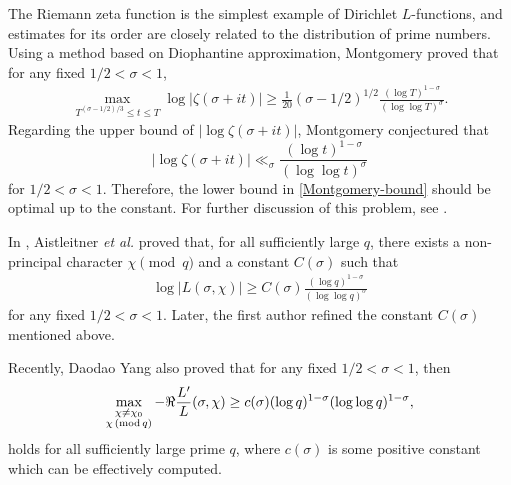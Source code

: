 \documentclass[12pt]{amsart}
\numberwithin{equation}{section}
\theoremstyle{plain}
\theoremstyle{remark}
\theoremstyle{definition}
\theoremstyle{remark}
\renewcommand{\mod}[1]{\,({\rm mod}\,#1)}
\begin{document}
The Riemann zeta function is the simplest example of Dirichlet $L$-functions, and estimates for its order are closely related to the distribution of prime numbers. Using a method based on Diophantine approximation, Montgomery \cite{Montgomery1977} proved that
for any fixed $1/2<\sigma<1$,
\begin{equation}\label{Montgomery-bound}
\begin{aligned}
\underset{T^{(\sigma-1/2)/3}\leq t\leq T}{\max}\log|\zeta(\sigma+it)|
\geq\frac{1}{20}(\sigma-1/2)^{1/2}\frac{(\log T)^{1-\sigma}}{(\log\log T)^{\sigma}}.
\end{aligned}
\end{equation}
Regarding the upper bound of $|\log \zeta(\sigma+it)|$, Montgomery \cite{Montgomery1977} conjectured that
\[
|\log\zeta(\sigma+it)|\ll_{\sigma}\frac{(\log t)^{1-\sigma}}{(\log\log t)^{\sigma}}
\]
for $1/2<\sigma<1$. Therefore, the lower bound in \eqref{Montgomery-bound} should be optimal up to the constant. For further discussion of this problem, see \cite{Aist2016,Bondarenko2018,de la2019,Dong2022,Jaskari2024,Sound2008,Sound2021,Yangdaodao2023,Yangdaodao2024,Yang2024,Yang2026}.



In \cite{Aist2019}, Aistleitner {\it et al.} proved that, for all sufficiently large $q$, there exists a non-principal character $\chi \pmod q$ and a constant $C(\sigma)$ such that
\begin{equation}\label{Aist2019}
\begin{aligned}
\log|L(\sigma,\chi)|\geq C(\sigma)\frac{(\log q)^{1-\sigma}}{(\log\log q)^{\sigma}}
\end{aligned}
\end{equation}
for any fixed $1/2<\sigma<1$. Later, the first author \cite{Xiao2022} refined the constant
$C(\sigma)$ mentioned above.

Recently, Daodao Yang \cite{Yangdaodao2023} also proved that for any fixed $1/2<\sigma<1$, then
\begin{equation}\label{DaodaoYang-lower-bound}
\begin{aligned}
\max_{\substack{\chi\neq\chi_0\\ \chi\mod q}}-\Re\frac{L'}{L}(\sigma,\chi)
\geq c(\sigma)(\log q)^{1-\sigma}(\log\log q)^{1-\sigma},
\end{aligned}
\end{equation}
holds for all sufficiently large prime $q$, where $c(\sigma)$ is some positive constant which can be effectively computed.
\end{document}
